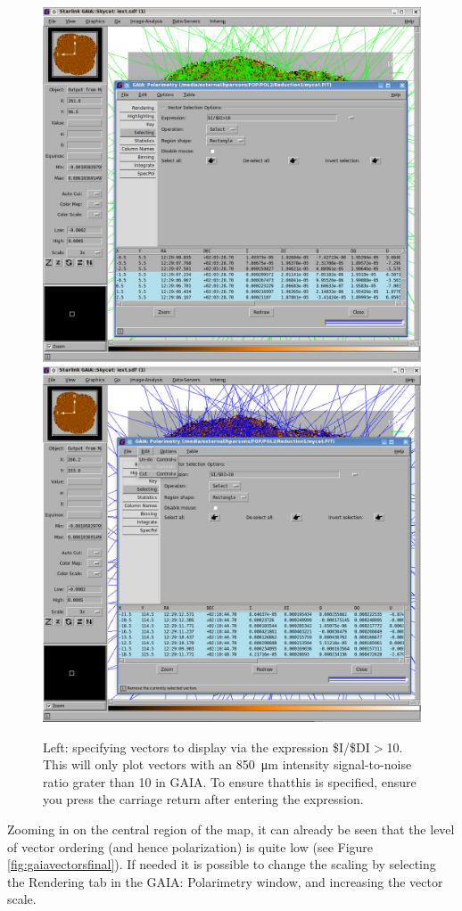 \begin{figure}[t!]
\begin{center}
\includegraphics[width=0.46\linewidth]{sc22-gaia-plot-vectors-4.png}
\includegraphics[width=0.46\linewidth]{sc22-gaia-plot-vectors-6.png}
\caption [Selecting Vectors in GAIA]{Left: specifying vectors
  to display via the expression \$I/\$DI$>$10. This will only plot
  vectors with an \SI{850}{\micro\metre} intensity signal-to-noise
  ratio grater than 10 in GAIA. To ensure thatthis is specified,
  ensure you press the carriage return after entering the expression.
}
\label{fig:gaiavectorssecond}
\end{center}
\end{figure}

Zooming in on the central region of the map, it can already be seen
that the level of vector ordering (and hence polarization) is quite
low (see Figure \ref{fig:gaiavectorsfinal}). If needed it is
possible to change the scaling by selecting the Rendering tab in the
GAIA: Polarimetry window, and increasing the vector scale.


